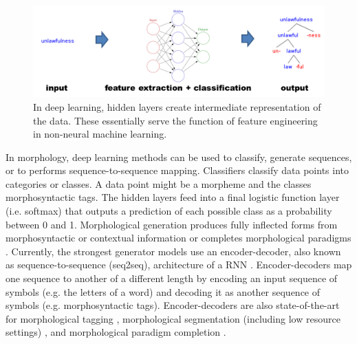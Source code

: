 \documentclass[12pt]{article}
\begin{document}
\begin{figure}[ht]
\begin{center}
\includegraphics[width=0.95\columnwidth]{DL.PNG}
\caption{In deep learning, hidden layers create intermediate representation of the data. These essentially serve the function of feature engineering in non-neural machine learning.}
\label{fig:DL}
\end{center}
\end{figure}

In morphology, deep learning methods can be used to classify, generate sequences, or to performs sequence-to-sequence mapping. Classifiers classify data points into categories or classes. A data point might be a morpheme and the classes morphosyntactic tags. 
The hidden layers feed into a final logistic function layer (i.e. softmax) that outputs a prediction of each possible class as a probability between 0 and 1. Morphological generation produces fully inflected forms from morphosyntactic or contextual information \cite{cotterell_conll-sigmorphon_2017} or completes morphological paradigms \cite{malouf_generating_2016}. Currently, the strongest generator models use an encoder-decoder, also known as sequence-to-sequence (seq2seq), architecture of a RNN \cite{sutskever2014,kann_neural_2016}. Encoder-decoders map one sequence to another of a different length by encoding an input sequence of symbols (e.g. the letters of a word) and decoding it as another sequence of symbols (e.g. morphosyntactic tags). Encoder-decoders are also state-of-the-art for morphological tagging \cite{heigold_extensive_2017}, morphological segmentation (including low resource settings) \cite{kann_fortification_2018}, and morphological paradigm completion \cite{cotterell_conllsigmorphon_2018}. 
\end{document}
